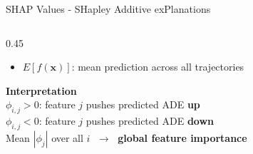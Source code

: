 \begin{frame}[noframenumbering]{SHAP Values - SHapley Additive exPlanations}
\begin{columns}[T]
\begin{column}{0.45\textwidth}
\begin{itemize}
        \item $E[f(\mathbf{x})]$: mean prediction across all trajectories
      \end{itemize}
      \vspace{0.4em}
      \textbf{Interpretation}\\[0.2em]
      $\phi_{i,j}>0$: feature $j$ pushes predicted ADE \textbf{up}\\
      $\phi_{i,j}<0$: feature $j$ pushes predicted ADE \textbf{down}\\[0.3em]
      Mean $|\phi_j|$ over all $i$ $\;\rightarrow\;$
      \textcolor{lmugreen}{\textbf{global feature importance}}
    \end{column}
  \end{columns}
\end{frame}

